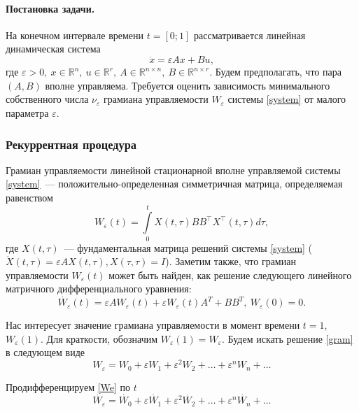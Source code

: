 \documentclass[../main.tex]{subfiles}
\begin{document}
 \paragraph{Постановка задачи.} На конечном интервале времени $ t = [0;1] $ рассматривается линейная динамическая система 
 \begin{equation}\label{system}
	 \dot{x} = \varepsilon A x + Bu, 
 \end{equation}
 где $ \varepsilon > 0, \ x \in \mathbb{R}^n, \ u \in \mathbb{R}^r, \ A \in \mathbb{R}^{n\times n}, \ B \in \mathbb{R}^{n\times r}  $. Будем предполагать, что пара $ \left( A, B\right)  $ вполне управляема. Требуется оценить зависимость минимального собственного числа $ \nu_{\varepsilon} $ грамиана управляемости $ W_{\varepsilon} $ системы \eqref{system} от малого параметра $ \varepsilon  $.
 \subsubsection{Рекуррентная процедура}
 Грамиан управляемости линейной стационарной вполне управляемой системы \eqref{system}~--- положительно-определенная симметричная матрица, определяемая равенством
 \begin{equation*}
	 W_{\varepsilon}(t) = \int \limits_0^t X(t,\tau) B B^{\top} X^{\top}(t,\tau) d\tau,
 \end{equation*}
 где $ X(t,\tau) $~--- фундаментальная матрица решений системы \eqref{system} ($  \dot{X}(t,\tau) = \varepsilon A X(t,\tau), X(\tau,\tau) = I  $).
 Заметим также, что грамиан управляемости $ W_{\varepsilon}(t) $ может быть найден, как решение следующего линейного матричного дифференциального уравнения:
 \begin{equation}\label{gram}
	 \dot{W_{\varepsilon}}(t) = \varepsilon A W_{\varepsilon}(t) + \varepsilon W_{\varepsilon}(t) A^T + BB^T, \ W_{\varepsilon}(0) = 0.
 \end{equation}
 
 Нас интересует значение грамиана управляемости в момент времени $ t = 1$, $ W_{\varepsilon}(1) $. Для краткости, обозначим $ W_{\varepsilon}(1) = W_{\varepsilon} $.
 Будем искать решение \eqref{gram} в следующем виде
 \begin{equation}\label{We}
	 W_{\varepsilon} = W_0 + \varepsilon W_1 + \varepsilon^2 W_2 + \dots + \varepsilon^n W_n + \dots 
 \end{equation}
 
 Продифференцируем \eqref{We} по $ t $
 \begin{equation}\label{dWe}
	 \dot{W_{\varepsilon}} = \dot{W_0} + \varepsilon \dot{W_1} + \varepsilon^2 \dot{W_2} + \dots + \varepsilon^n \dot{W_n} + \dots 
 \end{equation}
 
\end{document}
